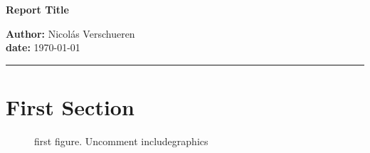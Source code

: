 \documentclass{article}
\begin{document}
\begin{center}
  \textbf{Report Title}
\end{center}
\begin{flushright}
  {\small \textbf{Author:} Nicol\'as Verschueren}\\
  {\small \textbf{date:} \today}
\end{flushright}
\hrule
\section{First Section}
\begin{figure}[H]
  \begin{center}
  \end{center}
    \caption{ first figure. Uncomment includegraphics}
  \end{figure}
  \label{fig:fig1}
\end{document}
